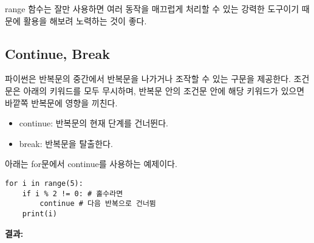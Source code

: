 range 함수는 잘만 사용하면 여러 동작을 매끄럽게 처리할 수 있는 강력한 도구이기 때문에 활용을 해보려 노력하는 것이 좋다.

\subsection{Continue, Break}

파이썬은 반복문의 중간에서 반복문을 나가거나 조작할 수 있는 구문을 제공한다. 조건문은 아래의 키워드를 모두 무시하며, 반복문 안의 조건문 안에 해당 키워드가 있으면 바깥쪽 반복문에 영향을 끼친다.

\begin{itemize}
    \item continue: 반복문의 현재 단계를 건너뛴다.
    \item break: 반복문을 탈출한다.
\end{itemize}

아래는 for문에서 continue를 사용하는 예제이다.

\begin{minipage}{\textwidth}
\begin{tcolorbox}[colframe=black, colback=white]
\begin{verbatim}
for i in range(5):
    if i % 2 != 0: # 홀수라면
        continue # 다음 반복으로 건너뜀
    print(i)
\end{verbatim}
\end{tcolorbox}
\textbf{결과: }
\end{minipage}

